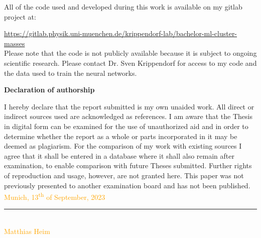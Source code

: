 \documentclass[12pt]{article}
\numberwithin{equation}{subsection}
\begin{document}
All of the code used and developed during this work is available on my gitlab project at:

\url{https://gitlab.physik.uni-muenchen.de/krippendorf-lab/bachelor-ml-cluster-masses}\\

Please note that the code is not publicly available because it is subject to ongoing scientific research. Please contact Dr. Sven Krippendorf for access to my code and the data used to train the neural networks.

\newpage
    
\nocite{*}
\RaggedRight


\newpage


\Large
\noindent
\textbf{Declaration of authorship} 
\vspace{0.5cm}
\noindent
\normalsize

I hereby declare that the report submitted is my own unaided work. All direct 
or indirect sources used are acknowledged as references. I am aware that the 
Thesis in digital form can be examined for the use of unauthorized aid and in 
order to determine whether the report as a whole or parts incorporated in it may 
be deemed as plagiarism. For the comparison of my work with existing sources I 
agree that it shall be entered in a database where it shall also remain after 
examination, to enable comparison with future Theses submitted. Further rights 
of reproduction and usage, however, are not granted here. This paper was not 
previously presented to another examination board and has not been published.
\\

\vspace{1cm}
\textcolor{orange}{Munich, 13\textsuperscript{th} of September, 2023} \\

\vspace{3cm}

\noindent\rule{0.5\textwidth}{0.4pt} \\

\textcolor{orange}{Matthias Heim}

\end{document}
